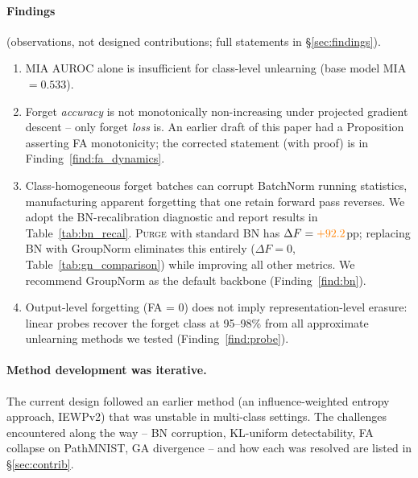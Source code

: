 \documentclass{article}
\newcommand{\ours}{\textsc{Purge}}
\newcommand{\new}[1]{{\color{orange}#1}}
\begin{document}
{\paragraph{Findings} (observations, not designed contributions; full statements in \S\ref{sec:findings}).
\begin{enumerate}[nosep,leftmargin=*]
\item MIA AUROC alone is insufficient for class-level unlearning (base model MIA $= 0.533$).
\item Forget \emph{accuracy} is not monotonically non-increasing under projected gradient descent -- only forget \emph{loss} is. An earlier draft of this paper had a Proposition asserting FA monotonicity; the corrected statement (with proof) is in Finding~\ref{find:fa_dynamics}.
\item Class-homogeneous forget batches can corrupt BatchNorm running statistics, manufacturing apparent forgetting that one retain forward pass reverses. We adopt the BN-recalibration diagnostic and report results in Table~\ref{tab:bn_recal}. \ours{} with standard BN has $\Delta F = \new{+92.2}$pp; replacing BN with GroupNorm eliminates this entirely ($\Delta F = 0$, Table~\ref{tab:gn_comparison}) while improving all other metrics. We recommend GroupNorm as the default backbone (Finding~\ref{find:bn}).
\item Output-level forgetting (FA = 0) does not imply representation-level erasure: linear probes recover the forget class at 95--98\% from all approximate unlearning methods we tested (Finding~\ref{find:probe}).
\end{enumerate}

\paragraph{Method development was iterative.} The current design followed an earlier method (an influence-weighted entropy approach, IEWPv2) that was unstable in multi-class settings. The challenges encountered along the way -- BN corruption, KL-uniform detectability, FA collapse on PathMNIST, GA divergence -- and how each was resolved are listed in \S\ref{sec:contrib}.

}
\end{document}
